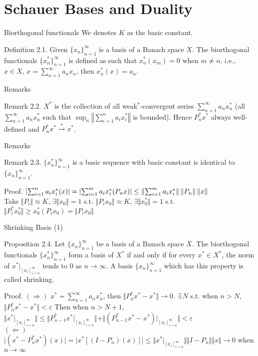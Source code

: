 \documentclass{beamer}
\newcommand{\xnssum}{\sum_{n=1}^\infty a_n x_n^*}
\newcommand{\wsconverge}{\mathop{\rightharpoonup}\limits^{*}}
\begin{document}
\section{Schauer Bases and Duality}
\begin{frame}{Biorthogonal functionals}
    We denotes $K$ as the basic constant.
    \begin{block}{Definition 2.1.}
        Given $\{x_n\}_{n=1}^\infty$ is a basis of a Banach space $X$. The biorthogonal functionals $\{x_n^*\}_{n=1}^\infty$ is defined as such that $ x_n^*(x_m)=0 $ when $m \neq n$. i.e., $x \in X,\,x=\sum_{n=1}^\infty a_n x_n,\,$then $x_n^*(x)=a_n$.
    \end{block}
    
\end{frame}
\begin{frame}{Remarks}
\begin{block}{Remark 2.2.}
        $X^*$ is the collection of all weak$^*$-convergent series $\sum_{n=1}^\infty a_n x_n^*$  (all $\sum_{n=1}^\infty a_n x_n^*$ such that $\sup_n
    \left\Vert \sum_{i=1}^n a_i x_i^*\right\Vert$ is bounded). Hence $P_n^*x^*$ always well-defined and $P_n^*x^* \wsconverge x^*$.
    \end{block}
    
\end{frame}
\begin{frame}{Remarks}
    \begin{block}{Remark 2.3.}
        $\{x_n^*\}_{n=1}^\infty$ is a basic sequence with basic constant is identical to $\{x_n\}_{n=1}^\infty$.
    \end{block}
    Proof. $\left|\sum_{i=1}^n a_i x_i^*(x)\right| = \left|\sum_{i=1}^m a_i x_i^*(P_nx)\right| \leq \left\lVert \sum_{i=1}^m a_i x_i^* \right\rVert \left\lVert P_n \right\rVert \left\lVert x \right\rVert$
\\
    Take $\Vert P_i \Vert \approx K$, $\exists \Vert x_0 \Vert =1$ s.t. $\Vert P_ix_0\Vert \approx K$, $\exists \Vert x_0^* \Vert=1$ s.t. $\Vert P_i^* x_0^*\Vert \geq x_0^*(P_ix_0)=\Vert P_ix_0\Vert$
\end{frame}
\begin{frame}{Shrinking Basis (1)}
    \begin{block}{Proposition 2.4.}
        Let $\{x_n\}_{n=1}^\infty$ be a basis of a Banach space $X$. The biorthogonal functionals $\{x_n^*\}_{n=1}^\infty$ form a basis of $X^*$ if and only if for every $x^*\in X^*$, the norm of $x^*\vert_{[x_i]_{i=n}^\infty}$ tends to 0 as $n\to \infty$. A basis $\{x_n\}_{n=1}^\infty$ which has this property is called shrinking.
    \end{block}
    Proof. $(\Rightarrow)$ $x^*=\xnssum$, then $\Vert P_n^*x^*-x^* \Vert \to 0$.
    $\exists \,N$ s.t. when $n>N$, $\Vert P_n^*x^* -x^*\Vert<\varepsilon$
    Then when $n>N+1$, $\Vert x^*\vert_{[x_i]_{i=n}^\infty} \Vert \leq \Vert P_{n-1}^*x^*\vert_{[x_i]_{i=n}^\infty} \Vert + \Vert ( P_{n-1}^*x^* -x^*)\vert_{[x_i]_{i=n}^\infty} \Vert < \varepsilon$
\\

    $(\Leftarrow)$ $\vert (x^*-P_n^*x^*)(x) \vert=\vert x^*[(I-P_n)(x)] \vert \leq \Vert x^*\vert_{[x_i]_{i=n}^\infty} \Vert \Vert I-P_n \Vert \Vert x \Vert \to 0 $ when $n\to\infty$
\end{frame}
\end{document}
